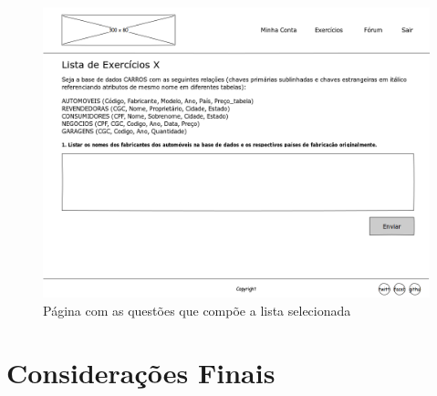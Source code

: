 \documentclass[graduacao,brazil]{ThesisPUC}
\begin{document}
\begin{figure}[H]
    \centering
    \includegraphics[width=\linewidth]{Imagens/QuestionPage.png}
    \caption{P\'{a}gina com as quest\~{o}es que comp\~{o}e a lista selecionada}
\end{figure}


\chapter{Considera\c{c}\~{o}es Finais}


\arial


\normalfont
\end{document}
